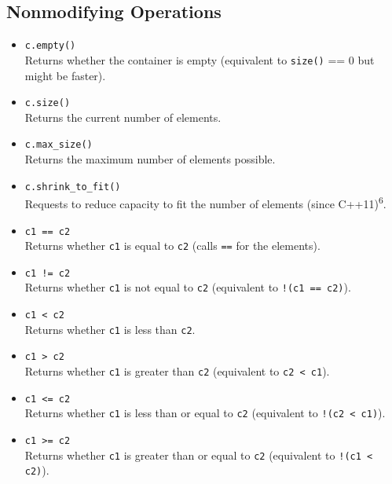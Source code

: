 \documentclass{report}
\begin{document}
    \subsection{Nonmodifying Operations}
    \bigbreak \noindent 
\begin{itemize}
    \item \texttt{c.empty()} \\
          Returns whether the container is empty (equivalent to \texttt{size()} == 0 but might be faster).
          
    \item \texttt{c.size()} \\
          Returns the current number of elements.
          
    \item \texttt{c.max\_size()} \\
          Returns the maximum number of elements possible.
          
    \item \texttt{c.shrink\_to\_fit()} \\
          Requests to reduce capacity to fit the number of elements (since C++11)\textsuperscript{6}.
          
    \item \texttt{c1 == c2} \\
          Returns whether \texttt{c1} is equal to \texttt{c2} (calls \texttt{==} for the elements).
          
    \item \texttt{c1 != c2} \\
          Returns whether \texttt{c1} is not equal to \texttt{c2} (equivalent to \texttt{!(c1 == c2)}).
          
    \item \texttt{c1 < c2} \\
          Returns whether \texttt{c1} is less than \texttt{c2}.
          
    \item \texttt{c1 > c2} \\
          Returns whether \texttt{c1} is greater than \texttt{c2} (equivalent to \texttt{c2 < c1}).
          
    \item \texttt{c1 <= c2} \\
          Returns whether \texttt{c1} is less than or equal to \texttt{c2} (equivalent to \texttt{!(c2 < c1)}).
          
    \item \texttt{c1 >= c2} \\
          Returns whether \texttt{c1} is greater than or equal to \texttt{c2} (equivalent to \texttt{!(c1 < c2)}).
\end{itemize}
\end{document}
